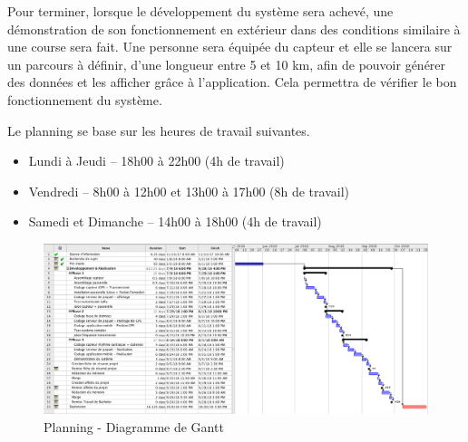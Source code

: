 Pour terminer, lorsque le développement du système sera achevé, une démonstration de son fonctionnement en extérieur dans des conditions similaire à une course sera fait. Une personne sera équipée du capteur et elle se lancera sur un parcours à définir, d’une longueur entre 5 et 10 km, afin de pouvoir générer des données et les afficher grâce à l’application. Cela permettra de vérifier le bon fonctionnement du système.

Le planning se base sur les heures de travail suivantes.

\begin{itemize}
\item Lundi à Jeudi – 18h00 à 22h00 (4h de travail)
\item Vendredi – 8h00 à 12h00 et 13h00 à 17h00 (8h de travail)
\item Samedi et Dimanche – 14h00 à 18h00 (4h de travail)
\end{itemize}


\begin{landscape}
\begin{figure}[h]
\centering
\includegraphics[width=\linewidth,height=\textheight,keepaspectratio]{../../planning/gantt_planning.png}
\caption[Planning - Diagramme de Gantt]{Planning - Diagramme de Gantt}
\label{fig:planning}
\end{figure}
\end{landscape}





